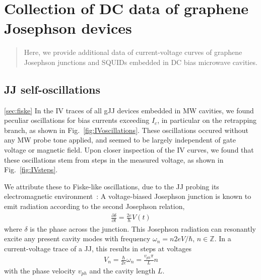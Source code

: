 \newchapstyle
\chapter{Collection of DC data of graphene Josephson devices}
\label{chap:gJJmisc}

%
%
\begin{abstract}
	\color{title}
	Here, we provide additional data of current-voltage curves of graphene Josephson junctions and SQUIDs embedded in DC bias microwave cavities.
\end{abstract}

\afterpage{\pagecolor{none}}\newpage

\section{JJ self-oscillations}\ref{sec:fiske}
In the IV traces of all gJJ devices embedded in MW cavities, we found peculiar oscillations for bias currents exceeding $I_c$, in particular on the retrapping branch, as shown in Fig.~\ref{fig:IVoscillations}.
%
These oscillations occured without any MW probe tone applied, and seemed to be largely independent of gate voltage or magnetic field.
%
Upon closer inspection of the IV curves, we found that these oscillations stem from steps in the measured voltage, as shown in Fig.~\ref{fig:IVsteps}.

We attribute these to Fiske-like oscillations, due to the JJ probing its electromagnetic environment~\cite{fiskeTemperatureMagneticField1964,eckSelfDetectionAcJosephson1964,coonJosephsonAcStep1965}:
%
A voltage-biased Josephson junction is known to emit radiation according to the second Josephson relation,
%
\begin{align}
\frac{\partial \delta}{\partial t}=\frac{2e}{\hbar}V(t)
\end{align}
%
where $\delta$ is the phase across the junction.
%
This Josephson radiation can resonantly excite any present cavity modes with frequency $\omega_n=n2eV/\hbar$, $n\in\mathbb{Z}$.
%
In a current-voltage trace of a JJ, this results in steps at voltages
%
\begin{align}
V_n=\frac{\hbar}{2e}\omega_n=\frac{v_{ph}\pi}{L}n
\end{align}
%
with the phase velocity $v_{ph}$ and the cavity length $L$.

